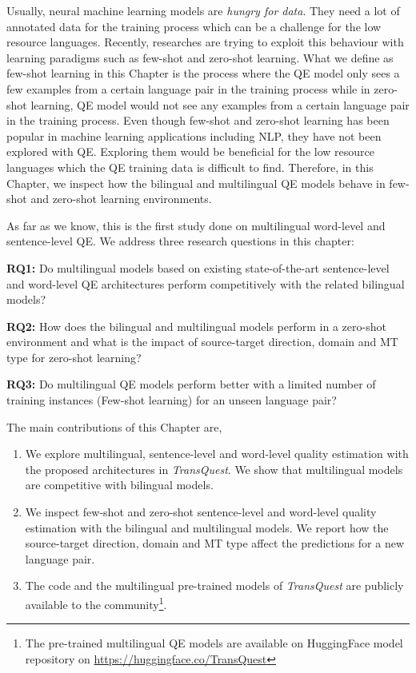 Usually, neural machine learning models are \textit{hungry for data}. They need a lot of annotated data for the training process which can be a challenge for the low resource languages. Recently, researches are trying to exploit this behaviour with learning paradigms such as few-shot and zero-shot learning.  What we define as few-shot learning in this Chapter is the process where the QE model only sees a few examples from a certain language pair in the training process \cite{10.1145/3386252} while in zero-shot learning, QE model would not see any examples from a certain language pair \cite{10.5555/1620163.1620201} in the training process. Even though few-shot and zero-shot learning has been popular in machine learning applications including NLP, they have not been explored with QE. Exploring them would be beneficial for the low resource languages which the QE training data is difficult to find. Therefore, in this Chapter, we inspect how the bilingual and multilingual QE models behave in few-shot and zero-shot learning environments.


As far as we know, this is the first study done on multilingual word-level and sentence-level QE. We address three research questions in this chapter:

\textbf{RQ1:} Do multilingual models based on existing state-of-the-art sentence-level and word-level QE architectures perform competitively with the related bilingual models?

\textbf{RQ2:} How does the bilingual and multilingual models perform in a zero-shot environment and what is the impact of source-target direction, domain and MT type for zero-shot learning?

\textbf{RQ3:} Do multilingual QE models perform better with a limited number of training instances (Few-shot learning) for an unseen language pair?


The main contributions of this Chapter are, 

\begin{enumerate}

\item We explore multilingual, sentence-level and word-level quality estimation with the proposed architectures in \textit{TransQuest}. We show that multilingual models are competitive with bilingual models.

\item We inspect few-shot and zero-shot sentence-level and word-level quality estimation with the bilingual and multilingual models. We report how the source-target direction, domain and MT type affect the predictions for a new language pair.

\item The code and the multilingual pre-trained models of \textit{TransQuest} are publicly available to the community\footnote{The pre-trained multilingual QE models are available on HuggingFace model repository on \url{https://huggingface.co/TransQuest}}.

\end{enumerate} 

